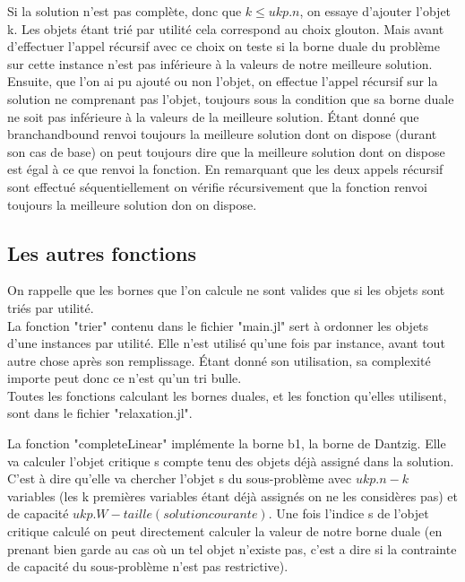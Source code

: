 \documentclass[12pt,a4paper]{article}
\begin{document}
Si la solution n'est pas complète, donc que $k \leqslant ukp.n$, on essaye d'ajouter l'objet k. Les objets étant trié par utilité cela correspond au choix glouton. Mais avant d’effectuer l'appel récursif avec ce choix on teste si la borne duale du problème sur cette instance n'est pas inférieure à la valeurs de notre meilleure solution. Ensuite, que l'on ai pu ajouté ou non l'objet, on effectue l'appel récursif sur la solution ne comprenant pas l'objet, toujours sous la condition que sa borne duale ne soit pas inférieure à la valeurs de la meilleure solution. Étant donné que branchandbound renvoi toujours la meilleure solution dont on dispose (durant son cas de base) on peut toujours dire que la meilleure solution dont on dispose est égal à ce que renvoi la fonction. En remarquant que les deux appels récursif sont effectué séquentiellement on vérifie récursivement que la fonction renvoi toujours la meilleure solution don on dispose.\\

\subsection{Les autres fonctions}
On rappelle que les bornes que l'on calcule ne sont valides que si les objets sont triés par utilité.\\

La fonction "trier" contenu dans le fichier "main.jl" sert à ordonner les objets d'une instances par utilité. Elle n'est utilisé qu'une fois par instance, avant tout autre chose après son remplissage. Étant donné son utilisation, sa complexité importe peut donc ce n'est qu'un tri bulle.\\

Toutes les fonctions calculant les bornes duales, et les fonction qu'elles utilisent, sont dans le fichier "relaxation.jl".

La fonction "completeLinear" implémente la borne b1, la borne de Dantzig. Elle va calculer l’objet critique s compte tenu des objets déjà assigné dans la solution. C'est à dire qu'elle va chercher l'objet s du sous-problème avec $ukp.n - k$ variables (les k premières variables étant déjà assignés on ne les considères pas) et de capacité $ukp.W - taille(solution courante)$. Une fois l'indice s de l'objet critique calculé on peut directement calculer la valeur de notre borne duale (en prenant bien garde au cas où un tel objet n'existe pas, c'est a dire si la contrainte de capacité du sous-problème n'est pas restrictive).\\
\end{document}

